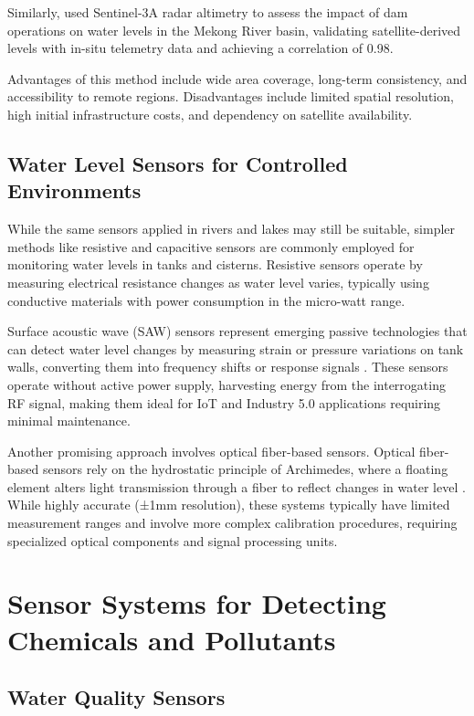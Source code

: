 \documentclass[conference]{IEEEtran}
\begin{document}
Similarly, \cite{ali_2024_satellite} used Sentinel-3A radar altimetry to assess the impact of dam operations on water levels in the Mekong River basin, validating satellite-derived levels with in-situ telemetry data and achieving a correlation of 0.98.

Advantages of this method include wide area coverage, long-term consistency, and accessibility to remote regions. Disadvantages include limited spatial resolution, high initial infrastructure costs, and dependency on satellite availability.

\subsection{Water Level Sensors for Controlled Environments}

While the same sensors applied in rivers and lakes may still be suitable, simpler methods like resistive and capacitive sensors are commonly employed for monitoring water levels in tanks and cisterns. Resistive sensors operate by measuring electrical resistance changes as water level varies, typically using conductive materials with power consumption in the micro-watt range.

Surface acoustic wave (SAW) sensors represent emerging passive technologies that can detect water level changes by measuring strain or pressure variations on tank walls, converting them into frequency shifts or response signals \cite{ali_2020_saw, sreejith_2024_modeling}. These sensors operate without active power supply, harvesting energy from the interrogating RF signal, making them ideal for IoT and Industry 5.0 applications requiring minimal maintenance.

Another promising approach involves optical fiber-based sensors. Optical fiber-based sensors rely on the hydrostatic principle of Archimedes, where a floating element alters light transmission through a fiber to reflect changes in water level \cite{ramos_2025_high}. While highly accurate (±1mm resolution), these systems typically have limited measurement ranges and involve more complex calibration procedures, requiring specialized optical components and signal processing units.

\section{Sensor Systems for Detecting Chemicals and Pollutants}

\subsection{Water Quality Sensors}
\end{document}
